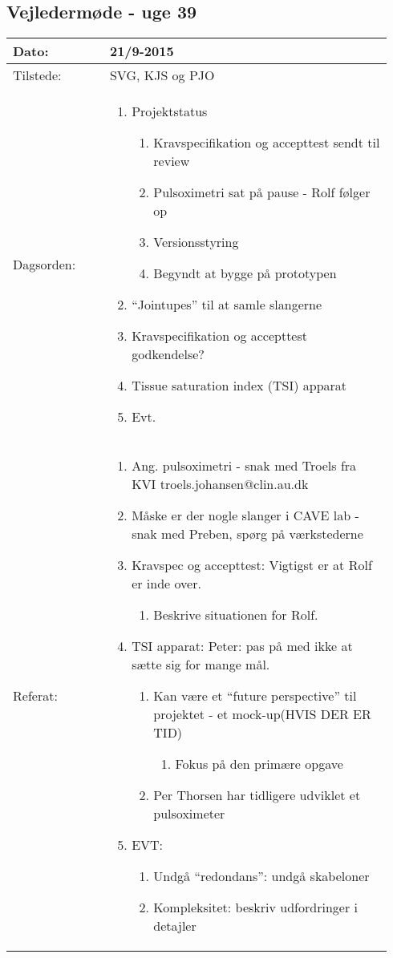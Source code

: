 	\subsection{Vejledermøde - uge 39} \label{app:vejlederuge39}
	\begin{longtable}{|p{0.24\linewidth}|p{0.7\linewidth}|}
		\hline
		Dato: & 21/9-2015\\ \hline
		Tilstede: & SVG, KJS og PJO\\ \hline
		Dagsorden: &
		\begin{enumerate}
			\item Projektstatus
			\begin{enumerate}
				\item Kravspecifikation og accepttest sendt til review
				\item Pulsoximetri sat på pause - Rolf følger op
				\item Versionsstyring
				\item Begyndt at bygge på prototypen 
			\end{enumerate}
			\item “Jointupes” til at samle slangerne
			\item Kravspecifikation og accepttest godkendelse?
			\item Tissue saturation index (TSI) apparat
			\item Evt. 
		\end{enumerate}
		\\ \hline
		Referat: & 
		\begin{enumerate}
			\item Ang. pulsoximetri - snak med Troels fra KVI troels.johansen@clin.au.dk
			\item Måske er der nogle slanger i CAVE lab - snak med Preben, spørg på værkstederne
			\item Kravspec og accepttest: Vigtigst er at Rolf er inde over. 
			\begin{enumerate}
				\item Beskrive situationen for Rolf. 
			\end{enumerate}
			\item TSI apparat: Peter: pas på med ikke at sætte sig for mange mål.
			\begin{enumerate}
				\item Kan være et “future perspective” til projektet - et mock-up(HVIS DER ER TID) 
				\begin{enumerate}
					\item Fokus på den primære opgave 
				\end{enumerate}
				\item Per Thorsen har tidligere udviklet et pulsoximeter
			\end{enumerate}
			\item EVT:
			\begin{enumerate}
				\item Undgå “redondans”: undgå skabeloner
				\item Kompleksitet: beskriv udfordringer i detajler
			\end{enumerate}
		\end{enumerate}
		\\ \hline
	\end{longtable}
	
